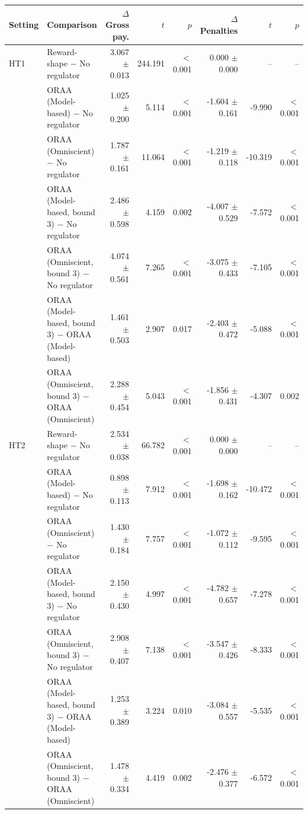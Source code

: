 \begin{tabular}{llrrrrrr}
\toprule
Setting & Comparison & $\Delta$ Gross pay. & $t$ & $p$ & $\Delta$ Penalties & $t$ & $p$ \\
\midrule
HT1 & Reward-shape $-$ No regulator & 3.067 $\pm$ 0.013 & 244.191 & $<$0.001 & 0.000 $\pm$ 0.000 & -- & -- \\
 & ORAA (Model-based) $-$ No regulator & 1.025 $\pm$ 0.200 & 5.114 & $<$0.001 & -1.604 $\pm$ 0.161 & -9.990 & $<$0.001 \\
 & ORAA (Omniscient) $-$ No regulator & 1.787 $\pm$ 0.161 & 11.064 & $<$0.001 & -1.219 $\pm$ 0.118 & -10.319 & $<$0.001 \\
 & ORAA (Model-based, bound 3) $-$ No regulator & 2.486 $\pm$ 0.598 & 4.159 & 0.002 & -4.007 $\pm$ 0.529 & -7.572 & $<$0.001 \\
 & ORAA (Omniscient, bound 3) $-$ No regulator & 4.074 $\pm$ 0.561 & 7.265 & $<$0.001 & -3.075 $\pm$ 0.433 & -7.105 & $<$0.001 \\
 & ORAA (Model-based, bound 3) $-$ ORAA (Model-based) & 1.461 $\pm$ 0.503 & 2.907 & 0.017 & -2.403 $\pm$ 0.472 & -5.088 & $<$0.001 \\
 & ORAA (Omniscient, bound 3) $-$ ORAA (Omniscient) & 2.288 $\pm$ 0.454 & 5.043 & $<$0.001 & -1.856 $\pm$ 0.431 & -4.307 & 0.002 \\
\addlinespace
HT2 & Reward-shape $-$ No regulator & 2.534 $\pm$ 0.038 & 66.782 & $<$0.001 & 0.000 $\pm$ 0.000 & -- & -- \\
 & ORAA (Model-based) $-$ No regulator & 0.898 $\pm$ 0.113 & 7.912 & $<$0.001 & -1.698 $\pm$ 0.162 & -10.472 & $<$0.001 \\
 & ORAA (Omniscient) $-$ No regulator & 1.430 $\pm$ 0.184 & 7.757 & $<$0.001 & -1.072 $\pm$ 0.112 & -9.595 & $<$0.001 \\
 & ORAA (Model-based, bound 3) $-$ No regulator & 2.150 $\pm$ 0.430 & 4.997 & $<$0.001 & -4.782 $\pm$ 0.657 & -7.278 & $<$0.001 \\
 & ORAA (Omniscient, bound 3) $-$ No regulator & 2.908 $\pm$ 0.407 & 7.138 & $<$0.001 & -3.547 $\pm$ 0.426 & -8.333 & $<$0.001 \\
 & ORAA (Model-based, bound 3) $-$ ORAA (Model-based) & 1.253 $\pm$ 0.389 & 3.224 & 0.010 & -3.084 $\pm$ 0.557 & -5.535 & $<$0.001 \\
 & ORAA (Omniscient, bound 3) $-$ ORAA (Omniscient) & 1.478 $\pm$ 0.334 & 4.419 & 0.002 & -2.476 $\pm$ 0.377 & -6.572 & $<$0.001 \\

\end{tabular}
